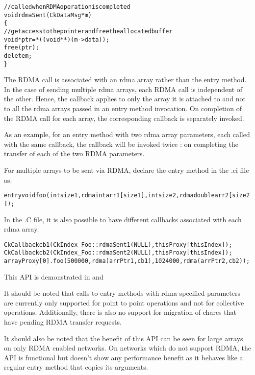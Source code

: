 \begin{alltt}
//called when RDMA operation is completed
void rdmaSent(CkDataMsg *m)
\{
  //get access to the pointer and free the allocated buffer
  void *ptr = *((void **)(m->data));
  free(ptr);
  delete m;
\}
\end{alltt}

The RDMA call is associated with an rdma array rather than the entry method.
In the case of sending multiple rdma arrays, each RDMA call is independent of the other.
Hence, the callback applies to only the array it is attached to and not to all the rdma
arrays passed in an entry method invocation. On completion of the RDMA call for each
array, the corresponding callback is separately invoked.

As an example, for an entry method with two rdma array parameters, each called with the same
callback, the callback will be invoked twice : on completing the transfer of each of the two
RDMA parameters.

\vspace{0.1in}
\noindent
For multiple arrays to be sent via RDMA, declare the entry method in the .ci file as:

\begin{alltt}
entry void foo (int size1, rdma int arr1[size1], int size2, rdma double arr2[size2]);
\end{alltt}

In the .C file, it is also possible to have different callbacks associated with each rdma array.
\begin{alltt}
CkCallback cb1(CkIndex_Foo::rdmaSent1(NULL), thisProxy[thisIndex]);
CkCallback cb2(CkIndex_Foo::rdmaSent2(NULL), thisProxy[thisIndex]);
arrayProxy[0].foo(500000, rdma(arrPtr1, cb1), 1024000, rdma(arrPtr2, cb2));
\end{alltt}

This API is demonstrated in  and 

\vspace{0.1in}
\noindent
It should be noted that calls to entry methods with rdma specified parameters are
currently only supported for point to point operations and not for collective operations.
Additionally, there is also no support for migration of chares that have pending RDMA transfer
requests.

\vspace{0.1in}
\noindent
It should also be noted that the benefit of this API can be seen for large arrays on
only RDMA enabled networks. On networks which do not support RDMA, the API is functional
but doesn't show any performance benefit as it behaves like a regular entry method that
copies its arguments.
